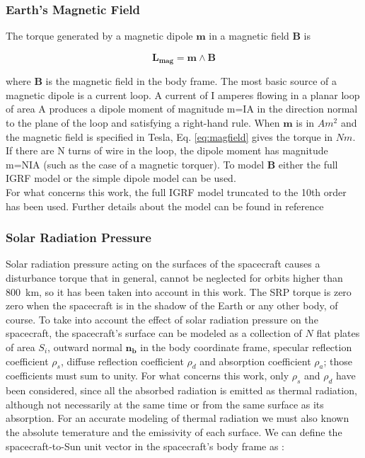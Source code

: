 \subsubsection{Earth's Magnetic Field}
The torque generated by a magnetic dipole $\textbf{m}$ in a magnetic field $\textbf{B}$ is

\begin{equation}
  \mathbf{L_{mag}} = \mathbf{m} \wedge \mathbf{B}
  \label{eq:magfield}
\end{equation}

where $\mathbf{B}$ is the magnetic field in the body frame.
The most basic source of a magnetic dipole is a current loop. A current of I amperes flowing in a planar loop of area A produces a dipole moment of magnitude m=IA in the direction normal to the plane of the loop and satisfying a right-hand rule.
When $\textbf{m}$ is in $Am^2$ and the magnetic field is specified in Tesla, Eq. \ref{eq:magfield} gives the torque in $Nm$. If there are N turns of wire in the loop, the dipole moment has magnitude m=NIA (such as the case of a magnetic torquer).
To model $\textbf{B}$ either the full IGRF model or the simple dipole model can be used.\\
For what concerns this work, the full IGRF model truncated to the 10th order has been used. Further details about the model can be found in reference \cite{Davis2014}

\subsubsection{Solar Radiation Pressure}
Solar radiation pressure acting on the surfaces of the spacecraft causes a disturbance torque that in general, cannot be neglected for orbits higher than \SI{800}{\kilo\meter}, so it has been taken into account in this work.
The SRP torque is zero zero when the spacecraft is in the shadow of the Earth or any other body, of course.
To take into account the effect of solar radiation pressure on the spacecraft, the spacecraft's surface can be modeled as a collection of $N$ flat plates of area $S_{i}$, outward normal $\mathbf{n_{b}}$ in the body coordinate frame, specular reflection coefficient $\rho_s$, diffuse reflection coefficient $\rho_{d}$ and absorption coefficient $\rho_{a}$; those coefficients must sum to unity.
For what concerns this work, only $\rho_s$ and $\rho_d$ have been considered, since all the absorbed radiation is emitted as thermal radiation,  although not necessarily at the same time or from the same surface as its absorption.
For an accurate modeling of thermal radiation we must also known the absolute temerature and the emissivity of each surface.
We can define the spacecraft-to-Sun unit vector in the spacecraft's body frame as :


